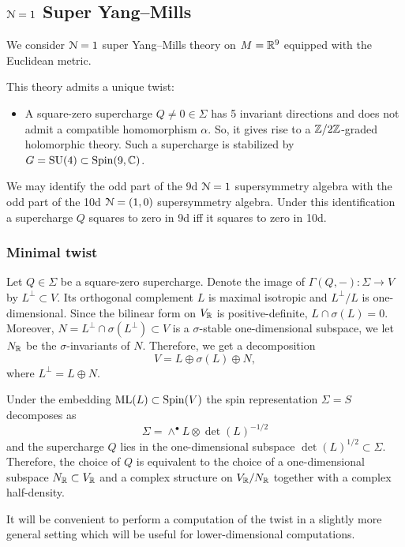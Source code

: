 \documentclass[10pt, oneside]{article}
\newcommand{\ML}{\mathrm{ML}}
\begin{document}
\subsection{\texorpdfstring{$\mathcal N=1$}{N=1} Super Yang--Mills}

We consider $\mathcal N=1$ super Yang--Mills theory on $M=\mathbb R^9$ equipped with the Euclidean metric.

This theory admits a unique twist:
\begin{itemize}
\item A square-zero supercharge $Q\neq 0\in\Sigma$ has 5 invariant directions and does not admit a compatible homomorphism $\alpha$. So, it gives rise to a $\mathbb Z/2\mathbb Z$-graded holomorphic theory. Such a supercharge is stabilized by $G=\mathrm{SU}(4)\subset \mathrm{Spin}(9, \mathbb C)$.
\end{itemize}

We may identify the odd part of the 9d $\mathcal{N}=1$ supersymmetry algebra with the odd part of the 10d $\mathcal{N}=(1, 0)$ supersymmetry algebra. Under this identification a supercharge $Q$ squares to zero in 9d iff it squares to zero in 10d.

\subsubsection{Minimal twist}
\label{sect:9dminimaltwist}

Let $Q\in\Sigma$ be a square-zero supercharge. Denote the image of $\Gamma(Q, -)\colon \Sigma\rightarrow V$ by $L^\perp\subset V$. Its orthogonal complement $L$ is maximal isotropic and $L^{\perp}/L$ is one-dimensional. Since the bilinear form on $V_\mathbb R$ is positive-definite, $L\cap \sigma(L) = 0$. Moreover, $N = L^{\perp}\cap \sigma(L^{\perp})\subset V$ is a $\sigma$-stable one-dimensional subspace, we let $N_\mathbb R$ be the $\sigma$-invariants of $N$. Therefore, we get a decomposition
\[V = L\oplus \sigma(L)\oplus N,\]
where $L^{\perp} = L\oplus N$.

Under the embedding $\ML(L)\subset \Spin(V)$ the spin representation $\Sigma=S$ decomposes as
\[\Sigma = \wedge^\bullet L\otimes \det(L)^{-1/2}\]
and the supercharge $Q$ lies in the one-dimensional subspace $\det(L)^{1/2}\subset \Sigma$. Therefore, the choice of $Q$ is equivalent to the choice of a one-dimensional subspace $N_\mathbb R\subset V_\mathbb R$ and a complex structure on $V_\mathbb R/N_\mathbb R$ together with a complex half-density.

It will be convenient to perform a computation of the twist in a slightly more general setting which will be useful for lower-dimensional computations.
\end{document}
